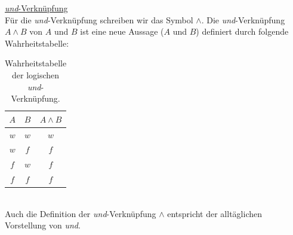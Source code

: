 \noindent
\underline{\textit{und}-Verknüpfung}\\
Für die \textit{und}-Verknüpfung schreiben wir das Symbol $\land$. Die \textit{und}-Verknüpfung $A  \land B$  von $A$ und $B$ ist eine neue Aussage ($A$ und $B$) definiert durch folgende Wahrheitstabelle:
\begin{table}[H]
	\begin{center}
		\begin{tabular}{c|c|c}
			$A$ & $B$ & $A\land B$ \\ \hline
			$w$ & $w$ & $w$        \\
			$w$ & $f$ & $f$        \\
			$f$ & $w$ & $f$        \\
			$f$ & $f$ & $f$
		\end{tabular}
	\end{center}
	\caption{Wahrheitstabelle der logischen \textit{und}-Verknüpfung.}
	\label{table:und}
\end{table}
\noindent
{}\\

\noindent
Auch die Definition der \textit{und}-Verknüpfung $\land$ entspricht der alltäglichen Vorstellung von \textit{und}.
\clearpage


